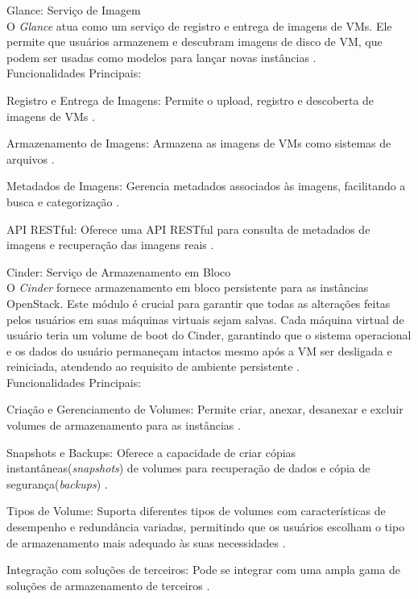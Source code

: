 \begin{description}
    \item Glance: Serviço de Imagem\\
    O \textit{Glance} atua como um serviço de registro e entrega de imagens de VMs. Ele permite que usuários armazenem e descubram imagens de disco de VM, que podem ser usadas como modelos para lançar novas instâncias \cite{openstackglance}.\\
    Funcionalidades Principais:
    \begin{description}
        \item Registro e Entrega de Imagens: Permite o upload, registro e descoberta de imagens de VMs \cite{openstackglance}.
        \item Armazenamento de Imagens: Armazena as imagens de VMs como sistemas de arquivos \cite{openstackglance}.
        \item Metadados de Imagens: Gerencia metadados associados às imagens, facilitando a busca e categorização \cite{openstackglance}.
        \item API RESTful: Oferece uma API RESTful para consulta de metadados de imagens e recuperação das imagens reais \cite{openstackglance}.
    \end{description}

    \item Cinder: Serviço de Armazenamento em Bloco\\
    O  \textit{Cinder} fornece armazenamento em bloco persistente para as instâncias OpenStack. Este módulo é crucial para garantir que todas as alterações feitas pelos usuários em suas máquinas virtuais sejam salvas. Cada máquina virtual de usuário teria um volume de boot do Cinder, garantindo que o sistema operacional e os dados do usuário permaneçam intactos mesmo após a VM ser desligada e reiniciada, atendendo ao requisito de ambiente persistente \cite{openstackcinder}.\\
    Funcionalidades Principais:
    \begin{description}
        \item Criação e Gerenciamento de Volumes: Permite criar, anexar, desanexar e excluir volumes de armazenamento para as instâncias \cite{openstackcinder}.
        \item Snapshots e Backups: Oferece a capacidade de criar cópias instantâneas(\textit{snapshots}) de volumes para recuperação de dados e cópia de segurança(\textit{backups}) \cite{openstackcinder}.
        \item Tipos de Volume: Suporta diferentes tipos de volumes com características de desempenho e redundância variadas, permitindo que os usuários escolham o tipo de armazenamento mais adequado às suas necessidades \cite{openstackcinder}.
        \item Integração com  soluções de terceiros: Pode se integrar com uma ampla gama de soluções de armazenamento de terceiros \cite{openstackcinder}.
    \end{description}


\end{description}
